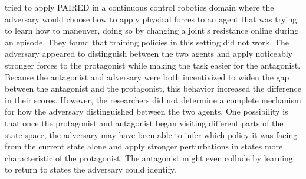 \citeauthor{dennis2020emergent} tried to apply PAIRED in a continuous control robotics domain where the adversary would choose how to apply physical forces to an agent that was trying to learn how to maneuver, doing so by changing a joint's resistance online during an episode. They found that training policies in this setting did not work.
The adversary appeared to distinguish between the two agents and apply noticeably stronger forces to the protagonist while making the task easier for the antagonist. 
Because the antagonist and adversary were both incentivized to widen the gap between the antagonist and the protagonist, this behavior increased the difference in their scores. 
However, the researchers did not determine a complete mechanism for how the adversary distinguished between the two agents. 
One possibility is that once the protagonist and antagonist began visiting different parts of the state space, the adversary may have been able to infer which policy it was facing from the current state alone and apply stronger perturbations in states more characteristic of the protagonist. 
The antagonist might even collude by learning to return to states the adversary could identify.
